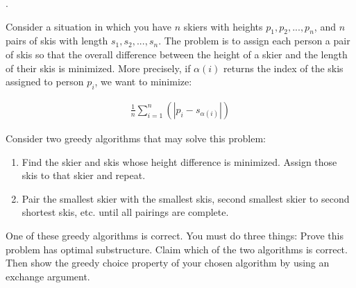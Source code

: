 \documentclass[12pt]{article}
\newcounter{quesnum}
\newcommand{\question}[2][??]{
\begin{list}{\labelitemi}{\leftmargin=2em}
\item [\arabic{quesnum}.] {} {#2}
\end{list}
\addtocounter{quesnum}{1}
}
\newcommand{\answer}[2][??]{
\ifthenelse{\boolean{solution}}{
\color{red} #2 \color{black}}
{\vspace*{#1}}
}
\begin{document}
\question[2]{
Consider a situation in which you have $n$ skiers with heights $p_1,p_2,...,p_n$, and $n$ pairs of skis with length $s_1,s_2,...,s_n$. The problem is to assign each person a pair of skis so that the overall difference between the height of a skier and the length of their skis is minimized. More precisely, if $\alpha(i)$ returns the index of the skis assigned to person $p_i$, we want to minimize:

\begin{align*}
\frac{1}{n}\sum_{i=1}^{n}(|p_i - s_{\alpha(i)}|)
\end{align*}

Consider two greedy algorithms that may solve this problem:

\begin{enumerate}
\item Find the skier and skis whose height difference is minimized. Assign those skis to that skier and repeat.
\item Pair the smallest skier with the smallest skis, second smallest skier to second shortest skis, etc. until all pairings are complete.
\end{enumerate}

One of these greedy algorithms is correct. You must do three things: Prove this problem has optimal substructure. Claim which of the two algorithms is correct. Then show the greedy choice property of your chosen algorithm by using an exchange argument.
}

\answer[0.25 in]{

}


\end{document}

